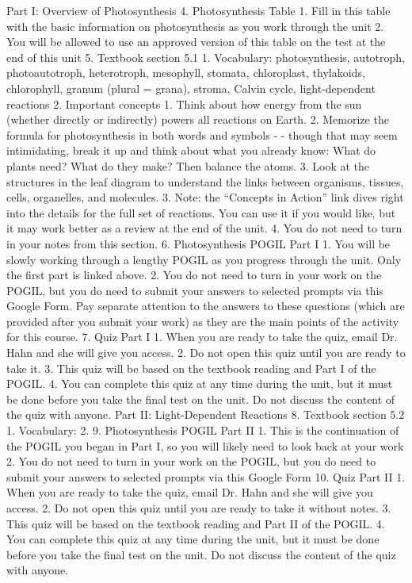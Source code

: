Part I: Overview of Photosynthesis
4. Photosynthesis Table
   1. Fill in this table with the basic information on photosynthesis as you work through the unit
   2. You will be allowed to use an approved version of this table on the test at the end of this unit
5. Textbook section 5.1
   1. Vocabulary: photosynthesis, autotroph, photoautotroph, heterotroph, mesophyll, stomata, chloroplast, thylakoids, chlorophyll, granum (plural = grana), stroma, Calvin cycle, light-dependent reactions
   2. Important concepts
      1. Think about how energy from the sun (whether directly or indirectly) powers all reactions on Earth.
      2. Memorize the formula for photosynthesis in both words and symbols - - though that may seem intimidating, break it up and think about what you already know: What do plants need? What do they make? Then balance the atoms.
      3. Look at the structures in the leaf diagram to understand the links between organisms, tissues, cells, organelles, and molecules.
   3. Note: the “Concepts in Action” link dives right into the details for the full set of reactions. You can use it if you would like, but it may work better as a review at the end of the unit. 
   4. You do not need to turn in your notes from this section. 
6. Photosynthesis POGIL Part I 
   1. You will be slowly working through a lengthy POGIL as you progress through the unit. Only the first part is linked above.
   2. You do not need to turn in your work on the POGIL, but you do need to submit your answers to selected prompts via this Google Form. Pay separate attention to the answers to these questions (which are provided after you submit your work) as they are the main points of the activity for this course.
7. Quiz Part I 
   1. When you are ready to take the quiz, email Dr. Hahn and she will give you access.
   2. Do not open this quiz until you are ready to take it.
   3. This quiz will be based on the textbook reading and Part I of the POGIL. 
   4. You can complete this quiz at any time during the unit, but it must be done before you take the final test on the unit. Do not discuss the content of the quiz with anyone.
Part II: Light-Dependent Reactions
8. Textbook section 5.2
   1. Vocabulary: 
   2. 9. Photosynthesis POGIL Part II 
   1. This is the continuation of the POGIL you began in Part I, so you will likely need to look back at your work 
   2. You do not need to turn in your work on the POGIL, but you do need to submit your answers to selected prompts via this Google Form
10. Quiz Part II 
   1. When you are ready to take the quiz, email Dr. Hahn and she will give you access.
   2. Do not open this quiz until you are ready to take it without notes.
   3. This quiz will be based on the textbook reading and Part II of the POGIL. 
   4. You can complete this quiz at any time during the unit, but it must be done before you take the final test on the unit. Do not discuss the content of the quiz with anyone.


